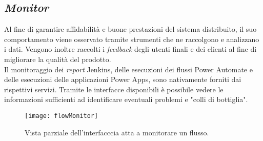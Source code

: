 \subsection{\emph{Monitor}}
Al fine di garantire affidabilità e buone prestazioni del sistema distribuito, il suo comportamento viene osservato tramite strumenti che ne raccolgono e analizzano i dati. 
Vengono inoltre raccolti i \emph{feedback} degli utenti finali e dei clienti al fine di migliorare la qualità del prodotto.\\
Il monitoraggio dei \emph{report} Jenkins, delle esecuzioni dei flussi Power Automate e delle esecuzioni delle applicazioni Power Apps, sono nativamente forniti dai rispettivi servizi.
Tramite le interfacce disponibili è possibile vedere le informazioni sufficienti ad identificare eventuali problemi e "colli di bottiglia".
\begin{figure}[htbp] 
    \centering 
    \texttt{[image: flowMonitor]} 
    \caption{Vista parziale dell'interfacccia atta a monitorare un flusso.}
    \label{fig:flowMonitor}
\end{figure}


